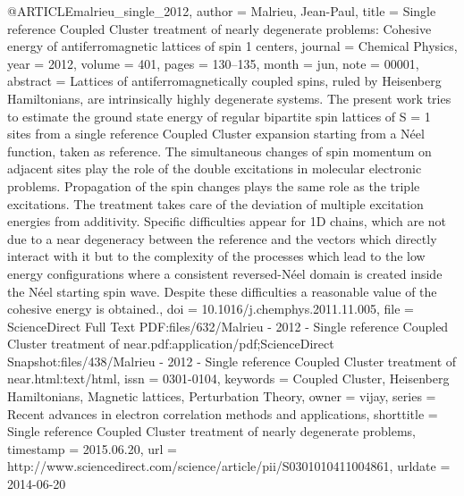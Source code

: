 @ARTICLE{malrieu_single_2012,
  author = {Malrieu, Jean-Paul},
  title = {Single reference {Coupled} {Cluster} treatment of nearly degenerate
	problems: {Cohesive} energy of antiferromagnetic lattices of spin
	1 centers},
  journal = {Chemical Physics},
  year = {2012},
  volume = {401},
  pages = {130--135},
  month = jun,
  note = {00001},
  abstract = {Lattices of antiferromagnetically coupled spins, ruled by Heisenberg
	Hamiltonians, are intrinsically highly degenerate systems. The present
	work tries to estimate the ground state energy of regular bipartite
	spin lattices of S = 1 sites from a single reference Coupled Cluster
	expansion starting from a Néel function, taken as reference. The
	simultaneous changes of spin momentum on adjacent sites play the
	role of the double excitations in molecular electronic problems.
	Propagation of the spin changes plays the same role as the triple
	excitations. The treatment takes care of the deviation of multiple
	excitation energies from additivity. Specific difficulties appear
	for 1D chains, which are not due to a near degeneracy between the
	reference and the vectors which directly interact with it but to
	the complexity of the processes which lead to the low energy configurations
	where a consistent reversed-Néel domain is created inside the Néel
	starting spin wave. Despite these difficulties a reasonable value
	of the cohesive energy is obtained.},
  doi = {10.1016/j.chemphys.2011.11.005},
  file = {ScienceDirect Full Text PDF:files/632/Malrieu - 2012 - Single reference Coupled Cluster treatment of near.pdf:application/pdf;ScienceDirect Snapshot:files/438/Malrieu - 2012 - Single reference Coupled Cluster treatment of near.html:text/html},
  issn = {0301-0104},
  keywords = {Coupled Cluster, Heisenberg Hamiltonians, Magnetic lattices, Perturbation
	Theory},
  owner = {vijay},
  series = {Recent advances in electron correlation methods and applications},
  shorttitle = {Single reference {Coupled} {Cluster} treatment of nearly degenerate
	problems},
  timestamp = {2015.06.20},
  url = {http://www.sciencedirect.com/science/article/pii/S0301010411004861},
  urldate = {2014-06-20}
}

